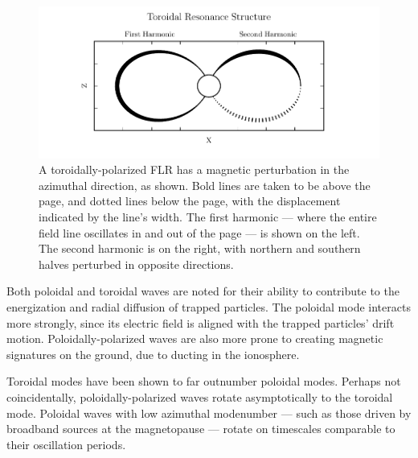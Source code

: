 \begin{figure}[!htb]
    \centering
    \includegraphics[width=\textwidth]{figures/toroidal.pdf}
    \caption[Toroidal Mode Structure]{
      A toroidally-polarized FLR has a magnetic perturbation in the azimuthal direction, as shown. Bold lines are taken to be above the page, and dotted lines below the page, with the displacement indicated by the line's width. The first harmonic --- where the entire field line oscillates in and out of the page --- is shown on the left. The second harmonic is on the right, with northern and southern halves perturbed in opposite directions. 
    }
    \label{fig_toroidal}
\end{figure}

Both poloidal and toroidal waves are noted for their ability to contribute to the energization and radial diffusion of trapped particles. The poloidal mode interacts more strongly, since its electric field is aligned with the trapped particles' drift motion. Poloidally-polarized waves are also more prone to creating magnetic signatures on the ground, due to ducting in the ionosphere\cite{fujita_1988,greifinger_1968}. 

Toroidal modes have been shown to far outnumber poloidal modes\cite{anderson_1990}. Perhaps not coincidentally, poloidally-polarized waves rotate asymptotically to the toroidal mode\cite{mann_1995,mann_1997,radoski_1974}. Poloidal waves with low azimuthal modenumber --- such as those driven by broadband sources at the magnetopause --- rotate on timescales comparable to their oscillation periods. 




